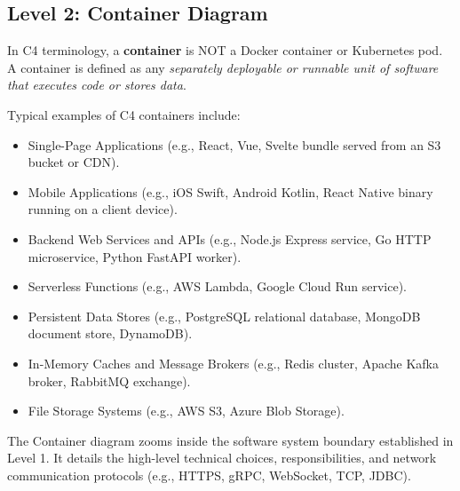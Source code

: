 \subsection{Level 2: Container Diagram}

In C4 terminology, a \textbf{container} is NOT a Docker container or Kubernetes pod. A container is defined as any \textit{separately deployable or runnable unit of software that executes code or stores data}. 

Typical examples of C4 containers include:
\begin{itemize}[leftmargin=14pt]
  \item Single-Page Applications (e.g., React, Vue, Svelte bundle served from an S3 bucket or CDN).
  \item Mobile Applications (e.g., iOS Swift, Android Kotlin, React Native binary running on a client device).
  \item Backend Web Services and APIs (e.g., Node.js Express service, Go HTTP microservice, Python FastAPI worker).
  \item Serverless Functions (e.g., AWS Lambda, Google Cloud Run service).
  \item Persistent Data Stores (e.g., PostgreSQL relational database, MongoDB document store, DynamoDB).
  \item In-Memory Caches and Message Brokers (e.g., Redis cluster, Apache Kafka broker, RabbitMQ exchange).
  \item File Storage Systems (e.g., AWS S3, Azure Blob Storage).
\end{itemize}

The Container diagram zooms inside the software system boundary established in Level 1. It details the high-level technical choices, responsibilities, and network communication protocols (e.g., HTTPS, gRPC, WebSocket, TCP, JDBC).

